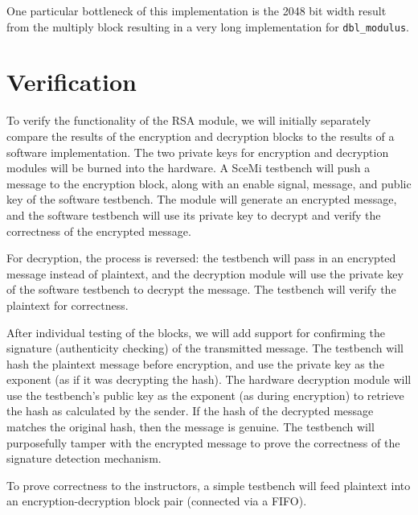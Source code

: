 \documentclass[12pt]{article}
\begin{document}
One particular bottleneck of this implementation is the 2048 bit width result from the multiply block
resulting in a very long implementation for {\tt dbl\_modulus}.

\section{Verification}
To verify the functionality of the RSA module, we will initially separately 
compare the results of the encryption and decryption blocks to the results
of a software implementation. The two private keys for encryption and
decryption modules will be burned into the hardware. A SceMi testbench will
push a message to the encryption block, along with an enable signal, message,
and public key of the software testbench. The module will generate an encrypted message,
and the software testbench will use its private key to decrypt and verify the 
correctness of the encrypted message.

For decryption, the process is reversed: the testbench will pass in an 
encrypted message instead of plaintext, and the decryption module will use
the private key of the software testbench to decrypt the message. The testbench
will verify the plaintext for correctness.

After individual testing of the blocks, we will add support for confirming the signature
(authenticity checking) of the transmitted message. The testbench will hash the plaintext
message before encryption, and use the private key as the exponent (as if it was decrypting
the hash). The hardware decryption module will use the testbench's public key as the exponent
(as during encryption) to retrieve the hash as calculated by the sender. If the hash of the
decrypted message matches the original hash, then the message is genuine. The testbench
will purposefully tamper with the encrypted message to prove the correctness of the 
signature detection mechanism. 

To prove correctness to the instructors, a simple testbench will feed plaintext into an
encryption-decryption block pair (connected via a FIFO).
\end{document}
